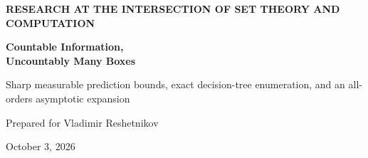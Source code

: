 \documentclass[11pt,letterpaper]{article}
\theoremstyle{definition}
\newcommand{\floor}[1]{\left\lfloor #1\right\rfloor}
\begin{document}
\hypersetup{pageanchor=false}
\begin{titlepage}
\setlength{\parindent}{0pt}
\vspace*{0.15in}
{\color{accent}\sffamily\bfseries RESEARCH AT THE INTERSECTION OF SET THEORY AND COMPUTATION\par}
\vspace{0.20in}
{\fontsize{29}{33}\selectfont\bfseries\color{ink} Countable Information,\\[4pt] Uncountably Many Boxes\par}
\vspace{0.2in}
{\Large Sharp measurable prediction bounds, exact decision-tree enumeration, and an all-orders asymptotic expansion\par}
\vspace{0.25in}
{\large Prepared for Vladimir Reshetnikov\par}
{October 3, 2026\par}
\vspace{0.20in}
\begin{abstract}
We study the distinction between choosing an unread coordinate and assigning a measurable event to a correct prediction. For a nonempty standard Borel set of boxes, a finite alphabet of size $q$, and $m$ deterministic players whose output maps are measurable for the cylinder $\sigma$-algebra, we prove that the optimal guaranteed number of correct guesses is exactly $\floor{m/q}$. The proof does not assume that success events are measurable. A simultaneous measure-extension construction supplies fair success probabilities for any countable collection of such players. Conversely, measurability of a blind player's success event forces its target range to be countable, pointwise or outside a cylinder-null set according to the chosen completion.


\end{abstract}
\end{titlepage}
\end{document}
